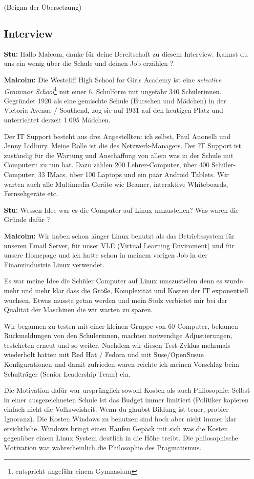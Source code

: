 \documentclass[10pt,a4paper,ngerman,twoside]{article} %
\begin{document}
(Beignn der Übersetzung)

\subsection*{Interview}
\textbf{Stu:} Hallo Malcom, danke für deine Bereitschaft zu diesem Interview. Kannst du uns ein wenig über die Schule und deinen Job erzählen ?

\textbf{Malcolm:} Die Westcliff High School for Girls Academy ist  eine \textit{selective Grammar School}\footnote{entspricht ungefähr einem Gymnasium} mit einer 6. Schulform mit ungefähr 340 Schülerinnen. Gegründet 1920 als eine gemischte Schule (Burschen und Mädchen) in der Victoria Avenue / Southend, zog sie auf 1931 auf den heutigen Platz und unterrichtet derzeit 1.095 Mädchen.

Der IT Support besteht aus drei Angestellten: ich selbst, Paul Anonelli und Jenny Lidbury. Meine Rolle ist die des Netzwerk-Managers. Der IT Support ist zuständig für die Wartung und Anschaffung von allem was in der Schule mit Computern zu tun hat. Dazu zählen 200 Lehrer-Computer, über 400 Schüler-Computer, 33 IMacs, über 100 Laptops und ein paar Android Tablets. Wir warten auch alle Multimedia-Geräte wie Beamer, interaktive Whiteboards, Fernsehgeräte etc.

\textbf{Stu:} Wessen Idee war es die Computer auf Linux umzustellen? Was waren die Gründe dafür ?

\textbf{Malcolm:} Wir haben schon länger Linux benutzt als das Betriebssystem für unseren Email Server, für unser VLE (Virtual Learning Enviroment) und für unsere Homepage und ich hatte schon in meinem vorigen Job in der Finanzindustrie Linux verwendet. 

Es war meine Idee die Schüler Computer auf Linux umszustellen denn es wurde mehr und mehr klar dass die Größe, Komplexität und Kosten der IT exponentiell wuchsen. Etwas musste getan werden und mein Stolz verbietet mir bei der Qualität der Maschinen die wir warten zu sparen. 

Wir begannen zu testen mit einer kleinen Gruppe von 60 Computer, bekamen Rückmeldungen von den Schülerinnen, machten notwendige Adjustierungen, testcheten erneut und so weiter. Nachdem wir diesen Test-Zyklus mehrmals wiederholt hatten mit Red Hat / Fedora und mit Suse/OpenSusue Konfigurationen und damit zufrieden waren reichte ich meinen Vorschlag beim Schulträger (Senior Leadership Team) ein.

Die Motivation dafür war ursprünglich sowohl Kosten als auch Philosophie: Selbst in einer ausgezeichneten Schule ist das Budget immer limitiert (Politiker kapieren einfach nicht die Volksweisheit: Wenn du glaubst Bildung ist teuer, probier Ignoranz). Die Kosten Windows zu benutzen sind hoch aber nicht immer klar ersichtliche. Windows bringt einen Haufen Gepäck mit sich was die Kosten gegenüber einem Linux System deutlich in die Höhe treibt. Die philosophische Motivation war wahrscheinlich die Philosophie des Pragmatismus.
\end{document}
